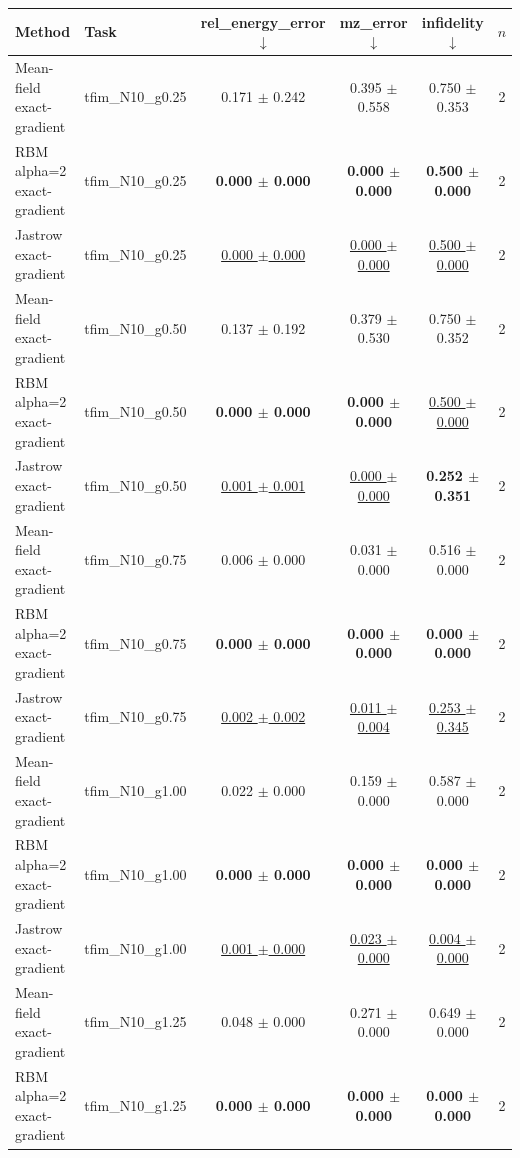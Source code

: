 \begin{tabular}{llcccc}
\toprule
Method & Task & rel\_energy\_error $\downarrow$ & mz\_error $\downarrow$ & infidelity $\downarrow$ & $n$ \\
\midrule
Mean-field exact-gradient & tfim\_N10\_g0.25 & 0.171 $\pm$ 0.242 & 0.395 $\pm$ 0.558 & 0.750 $\pm$ 0.353 & 2 \\
RBM alpha=2 exact-gradient & tfim\_N10\_g0.25 & \textbf{0.000 $\pm$ 0.000} & \textbf{0.000 $\pm$ 0.000} & \textbf{0.500 $\pm$ 0.000} & 2 \\
Jastrow exact-gradient & tfim\_N10\_g0.25 & \underline{0.000 $\pm$ 0.000} & \underline{0.000 $\pm$ 0.000} & \underline{0.500 $\pm$ 0.000} & 2 \\
\midrule
Mean-field exact-gradient & tfim\_N10\_g0.50 & 0.137 $\pm$ 0.192 & 0.379 $\pm$ 0.530 & 0.750 $\pm$ 0.352 & 2 \\
RBM alpha=2 exact-gradient & tfim\_N10\_g0.50 & \textbf{0.000 $\pm$ 0.000} & \textbf{0.000 $\pm$ 0.000} & \underline{0.500 $\pm$ 0.000} & 2 \\
Jastrow exact-gradient & tfim\_N10\_g0.50 & \underline{0.001 $\pm$ 0.001} & \underline{0.000 $\pm$ 0.000} & \textbf{0.252 $\pm$ 0.351} & 2 \\
\midrule
Mean-field exact-gradient & tfim\_N10\_g0.75 & 0.006 $\pm$ 0.000 & 0.031 $\pm$ 0.000 & 0.516 $\pm$ 0.000 & 2 \\
RBM alpha=2 exact-gradient & tfim\_N10\_g0.75 & \textbf{0.000 $\pm$ 0.000} & \textbf{0.000 $\pm$ 0.000} & \textbf{0.000 $\pm$ 0.000} & 2 \\
Jastrow exact-gradient & tfim\_N10\_g0.75 & \underline{0.002 $\pm$ 0.002} & \underline{0.011 $\pm$ 0.004} & \underline{0.253 $\pm$ 0.345} & 2 \\
\midrule
Mean-field exact-gradient & tfim\_N10\_g1.00 & 0.022 $\pm$ 0.000 & 0.159 $\pm$ 0.000 & 0.587 $\pm$ 0.000 & 2 \\
RBM alpha=2 exact-gradient & tfim\_N10\_g1.00 & \textbf{0.000 $\pm$ 0.000} & \textbf{0.000 $\pm$ 0.000} & \textbf{0.000 $\pm$ 0.000} & 2 \\
Jastrow exact-gradient & tfim\_N10\_g1.00 & \underline{0.001 $\pm$ 0.000} & \underline{0.023 $\pm$ 0.000} & \underline{0.004 $\pm$ 0.000} & 2 \\
\midrule
Mean-field exact-gradient & tfim\_N10\_g1.25 & 0.048 $\pm$ 0.000 & 0.271 $\pm$ 0.000 & 0.649 $\pm$ 0.000 & 2 \\
RBM alpha=2 exact-gradient & tfim\_N10\_g1.25 & \textbf{0.000 $\pm$ 0.000} & \textbf{0.000 $\pm$ 0.000} & \textbf{0.000 $\pm$ 0.000} & 2 \\

\end{tabular}
